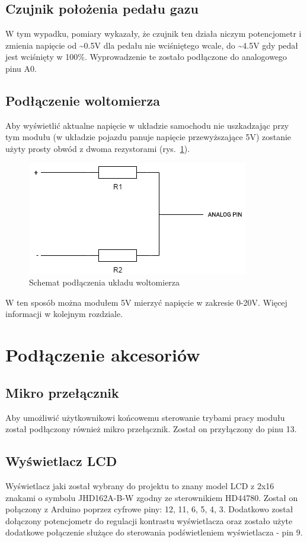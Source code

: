 \subsection{Czujnik położenia pedału gazu}
W tym wypadku, pomiary wykazały, że czujnik ten działa niczym potencjometr i zmienia napięcie od \textasciitilde0.5V dla pedału nie wciśniętego wcale, do \textasciitilde4.5V gdy pedał jest wciśnięty w 100\%. Wyprowadzenie te zostało podłączone do analogowego pinu A0.

\subsection{Podłączenie woltomierza} \label{voltometer}

Aby wyświetlić aktualne napięcie w układzie samochodu nie uszkadzając przy tym modułu (w układzie pojazdu panuje napięcie przewyższające 5V) zostanie użyty prosty obwód z dwoma rezystorami (rys.~\ref{fig:voltometer}). 

\begin{figure}[!htb]
\centering
\includegraphics[width=0.7\linewidth]{Rysunki/voltometer_schemat.png}
\caption{Schemat podłączenia układu woltomierza}
\label{fig:voltometer}
\end{figure}

W ten sposób można modułem 5V mierzyć napięcie w zakresie 0-20V. Więcej informacji w kolejnym rozdziale.

\section{Podłączenie akcesoriów}

\subsection{Mikro przełącznik}
Aby umożliwić użytkownikowi końcowemu sterowanie trybami pracy modułu został podłączony również mikro przełącznik. Został on przyłączony do pinu 13.

\subsection{Wyświetlacz LCD}
Wyświetlacz jaki został wybrany do projektu to znany model LCD z 2x16 znakami o symbolu JHD162A-B-W zgodny ze sterownikiem HD44780. Został on połączony z Arduino poprzez cyfrowe piny: 12, 11, 6, 5, 4, 3. Dodatkowo został dołączony potencjometr do regulacji kontrastu wyświetlacza oraz zostało użyte dodatkowe połączenie służące do sterowania podświetleniem wyświetlacza - pin 9.

